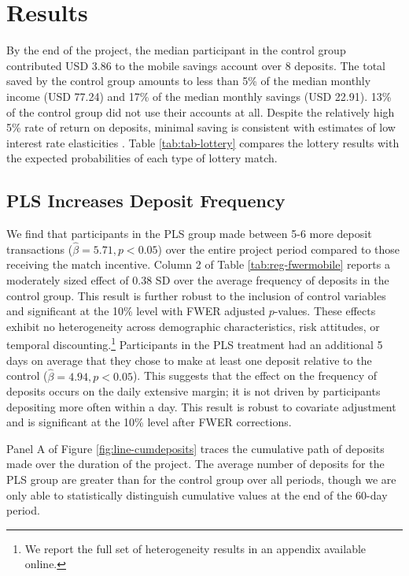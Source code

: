 \documentclass[11pt]{article}
\begin{document}
\section{Results} \label{sec:results}

	By the end of the project, the median participant in the control group contributed USD 3.86 to the mobile savings account over 8 deposits. The total saved by the control group amounts to less than 5\% of the median monthly income (USD 77.24) and 17\% of the median monthly savings (USD 22.91). 13\% of the control group did not use their accounts at all. Despite the relatively high 5\% rate of return on deposits, minimal saving is consistent with estimates of low interest rate elasticities \parencite{karlan_price_2018}. Table \ref{tab:tab-lottery} compares the lottery results with the expected probabilities of each type of lottery match.

	

	\subsection{PLS Increases Deposit Frequency}

		We find that participants in the PLS group made between 5-6 more deposit transactions ($\hat \beta = 5.71, p < 0.05$) over the entire project period compared to those receiving the match incentive. Column 2 of Table \ref{tab:reg-fwermobile} reports a moderately sized effect of 0.38 SD over the average frequency of deposits in the control group. This result is further robust to the inclusion of control variables and significant at the 10\% level with FWER adjusted $p$-values. These effects exhibit no heterogeneity across demographic characteristics, risk attitudes, or temporal discounting.\footnote{We report the full set of heterogeneity results in an appendix available online.} Participants in the PLS treatment had an additional 5 days on average that they chose to make at least one deposit relative to the control ($\hat \beta = 4.94, p < 0.05$). This suggests that the effect on the frequency of deposits occurs on the daily extensive margin; it is not driven by participants depositing more often within a day. This result is robust to covariate adjustment and is significant at the 10\% level after FWER corrections.

		

		Panel A of Figure \ref{fig:line-cumdeposits} traces the cumulative path of deposits made over the duration of the project. The average number of deposits for the PLS group are greater than for the control group over all periods, though we are only able to statistically distinguish cumulative values at the end of the 60-day period.
\end{document}
